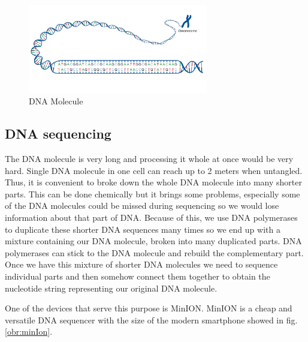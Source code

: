 
\begin{figure}
\centerline{\includegraphics[width=0.7\textwidth, height=0.3\textheight]{images/acgt}}
\caption[DNA]{DNA Molecule}
\label{obr:acgt}
\end{figure}

\subsection{DNA sequencing}

The DNA molecule is very long and processing it whole at once would be very hard. Single
DNA molecule in one cell can reach up to 2 meters when untangled.
Thus, it is convenient to broke down the whole DNA molecule into many shorter parts.
This can be done chemically but it brings some problems, especially some of the
DNA molecules could be missed during sequencing so we would lose information about
that part of DNA. Because of this, we use DNA polymerases to duplicate these shorter DNA sequences
many times so we end up with a mixture containing our DNA molecule, broken into
many duplicated parts. DNA polymerases can stick to the DNA molecule and rebuild the complementary
part. Once we have this mixture of shorter DNA molecules we need to sequence individual
parts and then somehow connect them together to obtain the nucleotide string representing
our original DNA molecule.

One of the devices that serve this purpose is MinION\cite{lu2016oxford}. MinION is
a cheap and versatile DNA sequencer with the size of the modern smartphone showed in fig.
\ref{obr:minIon}.

